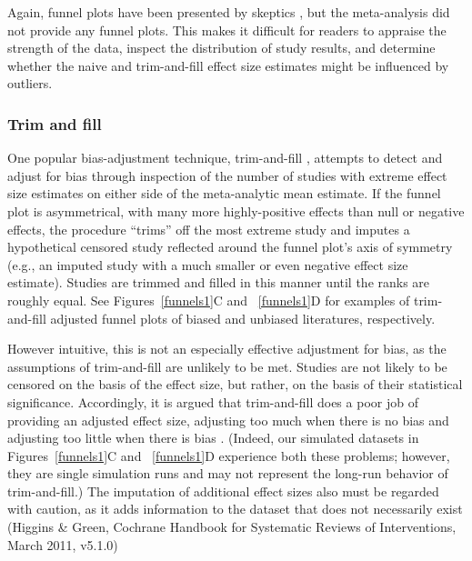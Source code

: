 \documentclass[man]{apa6}
\begin{document}
Again, funnel plots have been presented by skeptics \citep[e.g.,][]{Ferguson:2007}, but the \citet{Anderson:etal:2010} meta-analysis did not provide any funnel plots. This makes it difficult for readers to appraise the strength of the data, inspect the distribution of study results, and determine whether the naive and trim-and-fill effect size estimates might be influenced by outliers.

\subsubsection{Trim and fill}
One popular bias-adjustment technique, trim-and-fill \citep{Duval:Tweedie:2000}, attempts to detect and adjust for bias through inspection of the number of studies with extreme effect size estimates on either side of the meta-analytic mean estimate. If the funnel plot is asymmetrical, with many more highly-positive effects than null or negative effects, the procedure ``trims'' off the most extreme study and imputes a hypothetical censored study reflected around the funnel plot's axis of symmetry (e.g., an imputed study with a much smaller or even negative effect size estimate). Studies are trimmed and filled in this manner until the ranks are roughly equal. See Figures~\ref{funnels1}C and ~\ref{funnels1}D for examples of trim-and-fill adjusted funnel plots of biased and unbiased literatures, respectively. 

However intuitive, this is not an especially effective adjustment for bias, as the assumptions of trim-and-fill are unlikely to be met. Studies are not likely to be censored on the basis of the effect size, but rather, on the basis of their statistical significance. Accordingly, it is argued that trim-and-fill does a poor job of providing an adjusted effect size, adjusting too much when there is no bias and adjusting too little when there is bias \citep{Lakens:2014,Simonsohn:etal:2014b}. (Indeed, our simulated datasets in Figures~\ref{funnels1}C and ~\ref{funnels1}D experience both these problems; however, they are single simulation runs and may not represent the long-run behavior of trim-and-fill.)%
The imputation of additional effect sizes also must be regarded with caution, as it adds information to the dataset that does not necessarily exist (Higgins \& Green, Cochrane Handbook for Systematic Reviews of Interventions, March 2011, v5.1.0) %
\end{document}
